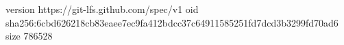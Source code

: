 version https://git-lfs.github.com/spec/v1
oid sha256:6cbd626218cb83eaee7ec9fa412bdcc37c64911585251fd7dcd3b3299fd70ad6
size 786528
